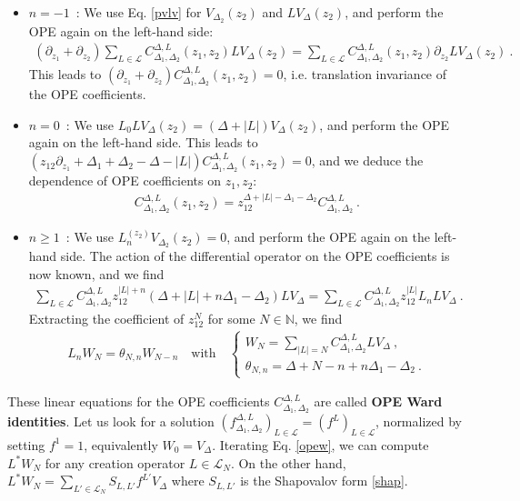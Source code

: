\documentclass[12pt, a4paper]{article}
\newcommand{\myindex}[1]{\textbf{\boldmath #1}}
\theoremstyle{break}
\begin{document}
\begin{itemize}
 \item $\boxed{n=-1}$\ : We use Eq. \eqref{pvlv} for $V_{\Delta_2}(z_2)$ and $LV_{\Delta}(z_2)$, and perform the OPE again on the left-hand side:
 \begin{align}
 \left(\partial_{z_1}+\partial_{z_2}\right) \sum_{L\in \mathcal{L}} C_{\Delta_1,\Delta_2}^{\Delta, L}(z_1,z_2)LV_\Delta(z_2) = \sum_{L\in \mathcal{L}} C_{\Delta_1,\Delta_2}^{\Delta, L}(z_1,z_2)\partial_{z_2} LV_\Delta(z_2) \ .
 \end{align}
 This leads to $(\partial_{z_1}+\partial_{z_2})C^{\Delta,L}_{\Delta_1,\Delta_2}(z_1,z_2)=0$, i.e. translation invariance of the OPE coefficients.
 \item $\boxed{n=0}$\ : We use $L_0LV_{\Delta}(z_2)= (\Delta+|L|) V_{\Delta}(z_2)$, and perform the OPE again on the left-hand side. This leads to $(z_{12}\partial_{z_1}+\Delta_1+\Delta_2-\Delta-|L|)C^{\Delta,L}_{\Delta_1,\Delta_2}(z_1,z_2) = 0$, and we deduce the dependence of OPE coefficients on $z_1,z_2$:
 \begin{align}
  C^{\Delta,L}_{\Delta_1,\Delta_2}(z_1,z_2) = z_{12}^{\Delta+|L|-\Delta_1-\Delta_2} C^{\Delta,L}_{\Delta_1,\Delta_2}\ . 
 \end{align}
\item $\boxed{n\geq 1}$\ : We use $L_n^{(z_2)}V_{\Delta_2}(z_2)=0$, and perform the OPE again on the left-hand side. The action of the differential operator on the OPE coefficients is now known, and we find 
\begin{align}
 \sum_{L\in\mathcal{L}} C^{\Delta,L}_{\Delta_1,\Delta_2}z_{12}^{|L|+n}(\Delta+|L|+n\Delta_1-\Delta_2) LV_{\Delta}= \sum_{L\in\mathcal{L}} C^{\Delta,L}_{\Delta_1,\Delta_2}z_{12}^{|L|}L_n LV_{\Delta}\ .
\end{align}
Extracting the coefficient of $z_{12}^N$ for some $N\in\mathbb{N}$, we find 
\begin{align}
 L_n W_N = \theta_{N,n}W_{N-n} \quad \text{with} \quad \left\{\begin{array}{l} W_N = \sum_{|L|=N}C^{\Delta,L}_{\Delta_1,\Delta_2} LV_{\Delta}\ , \\  \theta_{N,n} = \Delta+N-n+n\Delta_1-\Delta_2\ . \end{array}\right.
 \label{opew}
\end{align}
\end{itemize}
These linear equations for the OPE coefficients $C^{\Delta,L}_{\Delta_1,\Delta_2}$ are called \myindex{OPE Ward identities}. 
Let us look for a solution $\left(f^{\Delta,L}_{\Delta_1,\Delta_2}\right)_{L\in\mathcal{L}}=\left(f^L\right)_{L\in\mathcal{L}}$, normalized by setting $f^{1}=1$, equivalently $W_0 = V_\Delta$. Iterating Eq. \eqref{opew}, we can compute $L^*W_N$ for any creation operator $L\in\mathcal{L}_N$. On the other hand, $L^*W_N = \sum_{L'\in\mathcal{L}_N} S_{L,L'} f^{L'}V_\Delta$ where $S_{L,L'}$ is the Shapovalov form \eqref{shap}.
\end{document}
